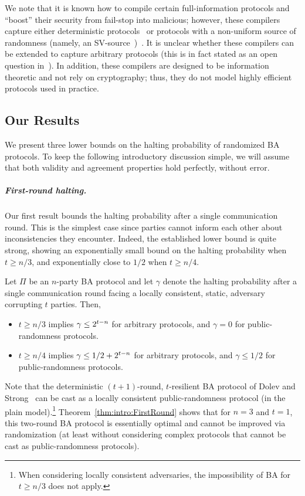 We note that it is known how to compile certain full-information protocols and ``boost'' their security from fail-stop into malicious; however, these compilers capture either deterministic protocols~\cite{Hadzilacos87,Bracha84,NT90} or protocols with a non-uniform source of randomness (namely, an SV-source~\cite{SV84})~\cite{GPV06}. It is unclear whether these compilers can be extended to capture arbitrary protocols (this is in fact stated as an open question in~\cite{Bracha84,GPV06}).
In addition, these compilers are designed to be information theoretic and not rely on cryptography; thus, they do not model highly efficient protocols used in practice.

\subsection{Our Results}\label{sec:intro:ourResult}
We present three lower bounds on the halting probability of randomized BA protocols.
To keep the following introductory discussion simple, we will assume that both validity and agreement properties hold perfectly, without error.

\subparagraph{First-round halting.}
Our first result bounds the halting probability after a single communication round. This is the simplest case since parties cannot inform each other about inconsistencies they encounter. Indeed, the established lower bound is quite strong, showing an exponentially small bound on the halting probability when $t\geq n/3$, and exponentially close to $1/2$ when $t\geq n/4$.

\begin{theorem}\label{thm:intro:FirstRound}
Let $\Pi$ be an $n$-party BA protocol and let $\gamma$ denote the halting probability after a single communication round facing a locally consistent, static, adversary corrupting $t$ parties. Then,
\begin{itemize}
	\item $t \ge n/3$ implies $\gamma \le 2^{t-n}$ for arbitrary protocols, and $\gamma=0$ for public-randomness protocols.
	\item $t \ge n/4$ implies $\gamma \le 1/2+2^{t-n}$ for arbitrary protocols, and $\gamma \leq 1/2$ for public-randomness protocols.
\end{itemize}
\end{theorem}

Note that the deterministic $(t+1)$-round, $t$-resilient BA protocol of Dolev and Strong~\cite{DS83} can be cast as a locally consistent public-randomness protocol (in the plain model).\footnote{When considering locally consistent adversaries, the impossibility of BA for $t\geq n/3$ does not apply.}
Theorem~\ref{thm:intro:FirstRound} shows that for $n=3$ and $t=1$, this two-round BA protocol is essentially optimal and cannot be improved via randomization (at least without considering complex protocols that cannot be cast as public-randomness protocols).

